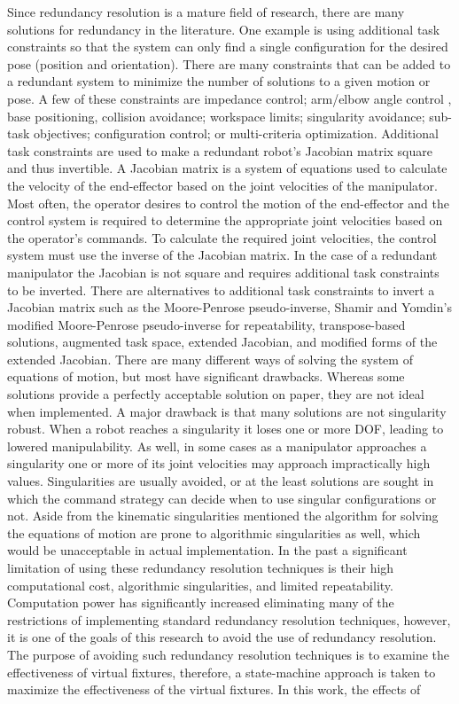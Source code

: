 \documentclass[onecolumn,10pt,final]{asme2ej}
\begin{document}
Since redundancy resolution is a mature field of research, there are many solutions for redundancy in the literature. One example is using additional task constraints so that the system can only find a single configuration for the desired pose (position and orientation). There are many constraints that can be added to a redundant system to minimize the number of solutions to a given motion or pose. A few of these constraints are impedance control\cite{yamanaka}; arm/elbow angle control \cite{equip}, base positioning, collision avoidance\cite{lim}; workspace limits\cite{shin}; singularity avoidance\cite{chung}; sub-task objectives\cite{nath}; configuration control\cite{a}; or multi-criteria optimization\cite{pin}. Additional task constraints are used to make a redundant robot's Jacobian matrix square and thus invertible. A Jacobian matrix is a system of equations used to calculate the velocity of the end-effector based on the joint velocities of the manipulator. Most often, the operator desires to control the motion of the end-effector and the control system is required to determine the appropriate joint velocities based on the operator's commands. To calculate the required joint velocities, the control system must use the inverse of the Jacobian matrix. In the case of a redundant manipulator the Jacobian is not square and requires additional task constraints to be inverted. There are alternatives to additional task constraints to invert a Jacobian matrix such as the Moore-Penrose pseudo-inverse\cite{dir7}, Shamir and Yomdin's modified Moore-Penrose pseudo-inverse for repeatability\cite{dir10}, transpose-based solutions\cite{dir12}, augmented task space\cite{dir18}, extended Jacobian\cite{dir19}, and modified forms of the extended Jacobian\cite{dir22}. There are many different ways of solving the system of equations of motion, but most have significant drawbacks. Whereas some solutions provide a perfectly acceptable solution on paper, they are not ideal when implemented. A major drawback is that many solutions are not singularity robust. When a robot reaches a singularity it loses one or more DOF, leading to lowered manipulability. As well, in some cases as a manipulator approaches a singularity one or more of its joint velocities may approach impractically high values. Singularities are usually avoided, or at the least solutions are sought in which the command strategy can decide when to use singular configurations or not. Aside from the kinematic singularities mentioned the algorithm for solving the equations of motion are prone to algorithmic singularities as well, which would be unacceptable in actual implementation. In the past a significant limitation of using these redundancy resolution techniques is their high computational cost, algorithmic singularities, and limited repeatability\cite{dir21,dir9}. Computation power has significantly increased eliminating many of the restrictions of implementing standard redundancy resolution techniques, however, it is one of the goals of this research to avoid the use of redundancy resolution. The purpose of avoiding such redundancy resolution techniques is to examine the effectiveness of virtual fixtures, therefore, a state-machine approach is taken to maximize the effectiveness of the virtual fixtures. In this work, the effects of 
\end{document}
